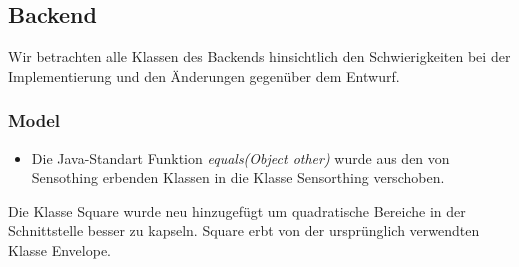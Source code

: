 \subsection{Backend}
Wir betrachten alle Klassen des Backends hinsichtlich den Schwierigkeiten bei der Implementierung und den Änderungen gegenüber dem Entwurf.

\subsubsection{Model}
\noChange
{}
\noChange
{}
\noChange
{}
\noChange
{}
\noChange
{}
\noChange
{}
\noChange
{}
\changedFunctions
\begin{itemize}[noitemsep]
    \item Die Java-Standart Funktion \textit{equals(Object other)} wurde aus den von Sensothing erbenden Klassen in die Klasse Sensorthing verschoben.
\end{itemize}
\noChange
{}
\noChange
{}
\noChange
{}
\noChange
{}
\noChange
{}
Die Klasse Square wurde neu hinzugefügt um quadratische Bereiche in der Schnittstelle besser zu kapseln. Square erbt von der ursprünglich verwendten Klasse Envelope.

